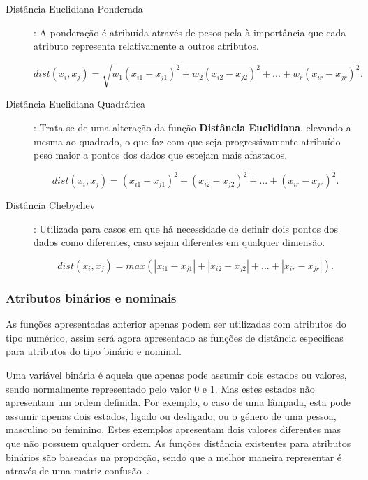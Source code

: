 \begin{description}
\item[Distância Euclidiana Ponderada]: A ponderação é atribuída através de pesos pela à importância que cada atributo representa relativamente a outros atributos.

\begin{equation}
dist(x_{i}, x_{j}) = \sqrt{w_{1}(x_{i1} - x_{j1})^2 + w_{2}(x_{i2} - x_{j2})^2 +...+ w_{r}(x_{ir} - x_{jr})^2}.
\end{equation} 

\item[Distância Euclidiana Quadrática]: Trata-se de uma alteração da função \textbf{Distância Euclidiana}, elevando a mesma ao quadrado, o que faz com que seja progressivamente atribuído peso maior a pontos dos dados que estejam mais afastados.

\begin{equation}
dist(x_{i}, x_{j}) = (x_{i1} - x_{j1})^2 + (x_{i2} - x_{j2})^2 +...+ (x_{ir} - x_{jr})^2.
\end{equation}

\item[Distância Chebychev]: Utilizada para casos em que há necessidade de definir dois pontos dos dados como diferentes, caso sejam diferentes em qualquer dimensão.

\begin{equation}
dist(x_{i}, x_{j}) = max(|x_{i1} - x_{j1}| + |x_{i2} - x_{j2}| +...+ |x_{ir} - x_{jr}|).
\label{eq:cheby}
\end{equation}

\end{description}

\subsubsection{Atributos binários e nominais}

As funções apresentadas anterior apenas podem ser utilizadas com atributos do tipo numérico, assim será agora apresentado as funções de distância especificas para atributos do tipo binário e nominal.

Uma variável binária é aquela que apenas pode assumir dois estados ou valores, sendo normalmente representado pelo valor 0 e 1. Mas estes estados não apresentam um ordem definida. Por exemplo, o caso de uma lâmpada, esta pode assumir apenas dois estados, ligado ou desligado, ou o género de uma pessoa, masculino ou feminino. Estes exemplos apresentam dois valores diferentes mas que não possuem qualquer ordem. As funções distância existentes para atributos binários são baseadas na proporção, sendo que a melhor maneira representar é através de uma matriz confusão~\citet{Liu2011}.

